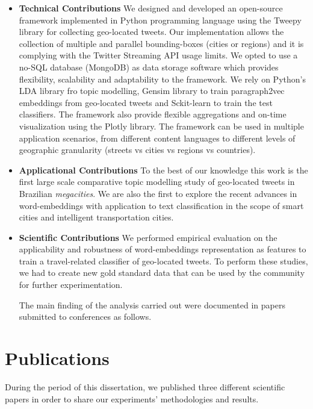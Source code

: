 \begin{itemize}
	\item \textbf{Technical Contributions}
	We designed and developed an open-source framework implemented in Python programming language using the Tweepy library for collecting geo-located tweets. Our implementation allows the collection of multiple and parallel bounding-boxes (cities or regions) and it is complying with the Twitter Streaming API usage limits. We opted to use a no-SQL database (MongoDB) as data storage software which provides flexibility, scalability and adaptability to the framework. We rely on Python's LDA library fro topic modelling, Gensim library to train paragraph2vec embeddings from geo-located tweets and Sckit-learn to train the test classifiers. The framework also provide flexible aggregations and on-time visualization using the Plotly library. The framework can be used in multiple application scenarios, from different content languages to different levels of geographic granularity (streets vs cities vs regions vs countries).

	\item \textbf{Applicational Contributions}
	To the best of our knowledge this work is the first large scale comparative topic modelling study of geo-located tweets in Brazilian \textit{megacities}. We are also the first to explore the recent advances in word-embeddings with application to text classification in the scope of smart cities and intelligent transportation cities.
	
	\item \textbf{Scientific Contributions}
	We performed empirical evaluation on the applicability and robustness of word-embeddings representation as features to train a travel-related classifier of geo-located tweets. To perform these studies, we had to create new gold standard data that can be used by the community for further experimentation.
	
	The main finding of the analysis carried out were documented in papers submitted to conferences as follows. 
\end{itemize}

\section{Publications}
\label{sec:publications}
During the period of this dissertation, we published three different scientific papers in order to share our experiments' methodologies and results.

